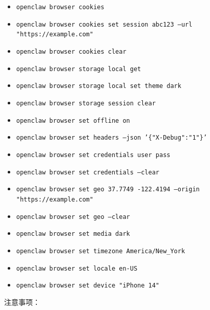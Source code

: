 \begin{itemize}
  \item \texttt{openclaw browser cookies}
  \item \texttt{openclaw browser cookies set session abc123 --url "https://example.com"}
  \item \texttt{openclaw browser cookies clear}
  \item \texttt{openclaw browser storage local get}
  \item \texttt{openclaw browser storage local set theme dark}
  \item \texttt{openclaw browser storage session clear}
  \item \texttt{openclaw browser set offline on}
  \item \texttt{openclaw browser set headers --json '\{"X-Debug":"1"\}'}
  \item \texttt{openclaw browser set credentials user pass}
  \item \texttt{openclaw browser set credentials --clear}
  \item \texttt{openclaw browser set geo 37.7749 -122.4194 --origin "https://example.com"}
  \item \texttt{openclaw browser set geo --clear}
  \item \texttt{openclaw browser set media dark}
  \item \texttt{openclaw browser set timezone America/New\_York}
  \item \texttt{openclaw browser set locale en-US}
  \item \texttt{openclaw browser set device "iPhone 14"}
\end{itemize}


注意事项：

